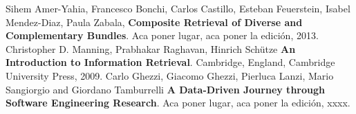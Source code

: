 \begin{thebibliography}{9}
  Sihem Amer-Yahia, Francesco Bonchi, Carlos Castillo,
  Esteban Feuerstein, Isabel Mendez-Diaz, Paula Zabala,
  \textbf{Composite Retrieval of Diverse and Complementary Bundles}.
  Aca poner lugar,
  aca poner la edición,
  2013.
  Christopher D. Manning, Prabhakar Raghavan, Hinrich Schütze
  \textbf{An Introduction to Information Retrieval}.
  Cambridge, England,
  Cambridge University Press,
  2009.
  Carlo Ghezzi, Giacomo Ghezzi, Pierluca Lanzi, Mario Sangiorgio and Giordano Tamburrelli
  \textbf{A Data-Driven Journey through Software Engineering Research}.
  Aca poner lugar,
  aca poner la edición,
  xxxx.
\end{thebibliography} 
